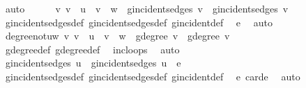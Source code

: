 \begin{isabellebody}
\ auto\isanewline
\ \ \ \ \isamarkupfalse%
\ {\isachardoublequoteopen}{\isasymAnd}v{\isachardot}{\kern0pt}\ v\ {\isasymnoteq}\ u\ {\isasymLongrightarrow}\ v\ {\isasymnoteq}\ w\ {\isasymLongrightarrow}\ g{\isacharprime}{\kern0pt}{\isachardot}{\kern0pt}incident{\isacharunderscore}{\kern0pt}sedges\ v\ {\isacharequal}{\kern0pt}\ g{\isachardot}{\kern0pt}incident{\isacharunderscore}{\kern0pt}sedges\ v{\isachardoublequoteclose}\isanewline
\ \ \ \ \ \ \isamarkupfalse%
\ g{\isacharprime}{\kern0pt}{\isachardot}{\kern0pt}incident{\isacharunderscore}{\kern0pt}sedges{\isacharunderscore}{\kern0pt}def\ g{\isachardot}{\kern0pt}incident{\isacharunderscore}{\kern0pt}sedges{\isacharunderscore}{\kern0pt}def\ g{\isachardot}{\kern0pt}incident{\isacharunderscore}{\kern0pt}def\ \isamarkupfalse%
\ e\ \isamarkupfalse%
\ auto\isanewline
\ \ \ \ \isamarkupfalse%
\ \isamarkupfalse%
\ degree{\isacharunderscore}{\kern0pt}not{\isacharunderscore}{\kern0pt}u{\isacharunderscore}{\kern0pt}w{\isacharcolon}{\kern0pt}\ {\isachardoublequoteopen}{\isasymAnd}v{\isachardot}{\kern0pt}\ v\ {\isasymnoteq}\ u\ {\isasymLongrightarrow}\ v\ {\isasymnoteq}\ w\ {\isasymLongrightarrow}\ g{\isacharprime}{\kern0pt}{\isachardot}{\kern0pt}degree\ v\ {\isacharequal}{\kern0pt}\ g{\isachardot}{\kern0pt}degree\ v{\isachardoublequoteclose}\isanewline
\ \ \ \ \ \ \isamarkupfalse%
\ g{\isacharprime}{\kern0pt}{\isachardot}{\kern0pt}degree{\isacharunderscore}{\kern0pt}def\ g{\isachardot}{\kern0pt}degree{\isacharunderscore}{\kern0pt}def\ \isamarkupfalse%
\ inc{\isacharunderscore}{\kern0pt}loops\ \isamarkupfalse%
\ auto\isanewline
\ \ \ \ \isamarkupfalse%
\ {\isachardoublequoteopen}g{\isacharprime}{\kern0pt}{\isachardot}{\kern0pt}incident{\isacharunderscore}{\kern0pt}sedges\ u\ {\isacharequal}{\kern0pt}\ g{\isachardot}{\kern0pt}incident{\isacharunderscore}{\kern0pt}sedges\ u\ {\isasymunion}\ {\isacharbraceleft}{\kern0pt}e{\isacharbraceright}{\kern0pt}{\isachardoublequoteclose}\isanewline
\ \ \ \ \ \ \isamarkupfalse%
\ g{\isacharprime}{\kern0pt}{\isachardot}{\kern0pt}incident{\isacharunderscore}{\kern0pt}sedges{\isacharunderscore}{\kern0pt}def\ g{\isachardot}{\kern0pt}incident{\isacharunderscore}{\kern0pt}sedges{\isacharunderscore}{\kern0pt}def\ g{\isachardot}{\kern0pt}incident{\isacharunderscore}{\kern0pt}def\ \isamarkupfalse%
\ e\ card{\isacharunderscore}{\kern0pt}e\ \isamarkupfalse%
\ auto\isanewline

\end{isabellebody}
